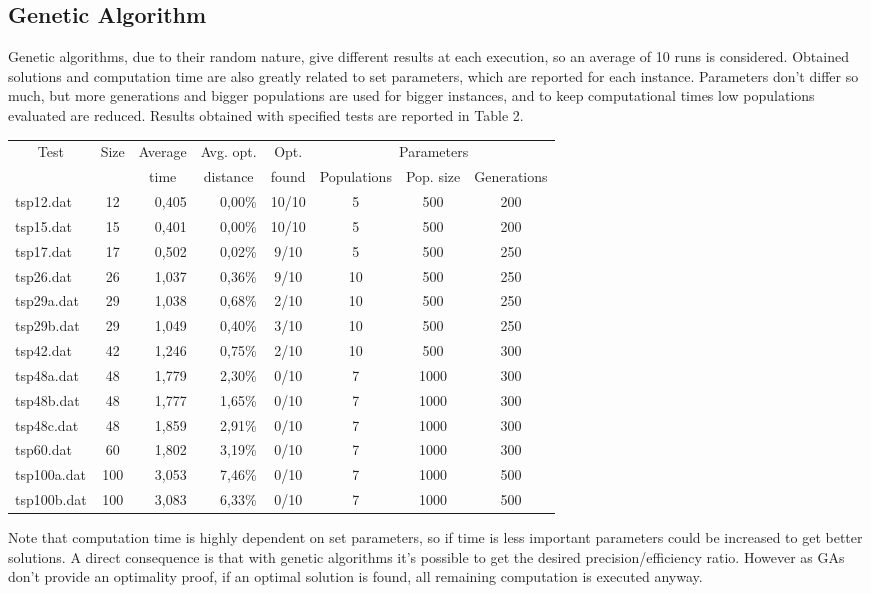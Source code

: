 	\subsection{Genetic Algorithm}
		Genetic algorithms, due to their random nature, give different results at each execution, so an average of 10 runs is considered. Obtained solutions and computation time are also greatly related to set parameters, which are reported for each instance. Parameters don't differ so much, but more generations and bigger populations are used for bigger instances, and to keep computational times low populations evaluated are reduced. Results obtained with specified tests are reported in Table 2.
		
		\begin{center}
			\hspace*{-1.2cm}
			\begin{tabular}{ | l | c | r | r | c | c | c | c |}
				\hline
				\multicolumn{1}{|c}{\multirow{2}{*}{Test}} & \multicolumn{1}{|c|}{\multirow{2}{*}{Size}} & Average & Avg. opt. & Opt. & \multicolumn{3}{c|}{Parameters} \\
				\cline{6-8}
				& & \multicolumn{1}{c}{time} & \multicolumn{1}{|c|}{distance} & found & Populations & Pop. size & Generations\\
				\hline
				tsp12.dat		& 12		& 0,405	& 0,00\%	& 10/10	& 5	& 500	& 200\\
				tsp15.dat		& 15		& 0,401	& 0,00\%	& 10/10	& 5	& 500	& 200\\
				tsp17.dat		& 17		& 0,502	& 0,02\%	& 9/10	& 5	& 500	& 250\\
				tsp26.dat		& 26		& 1,037	& 0,36\%	& 9/10	& 10	& 500	& 250\\
				tsp29a.dat		& 29		& 1,038	& 0,68\%	& 2/10	& 10	& 500	& 250\\
				tsp29b.dat		& 29		& 1,049	& 0,40\%	& 3/10	& 10	& 500	& 250\\
				tsp42.dat		& 42		& 1,246	& 0,75\%	& 2/10	& 10	& 500	& 300\\
				tsp48a.dat		& 48		& 1,779	& 2,30\%	& 0/10	& 7	& 1000	& 300\\
				tsp48b.dat		& 48		& 1,777	& 1,65\%	& 0/10	& 7	& 1000	& 300\\
				tsp48c.dat		& 48		& 1,859	& 2,91\%	& 0/10	& 7	& 1000	& 300\\
				tsp60.dat		& 60		& 1,802	& 3,19\%	& 0/10	& 7	& 1000	& 300\\
				tsp100a.dat	& 100	& 3,053	& 7,46\%	& 0/10	& 7	& 1000	& 500\\
				tsp100b.dat	& 100	& 3,083	& 6,33\%	& 0/10	& 7	& 1000	& 500\\
				\hline
			\end{tabular}
		\end{center}
		\vspace{1em}
		Note that computation time is highly dependent on set parameters, so if time is less important parameters could be increased to get better solutions. A direct consequence is that with genetic algorithms it's possible to get the desired precision/efficiency ratio. However as GAs don't provide an optimality proof, if an optimal solution is found, all remaining computation is executed anyway.
		
